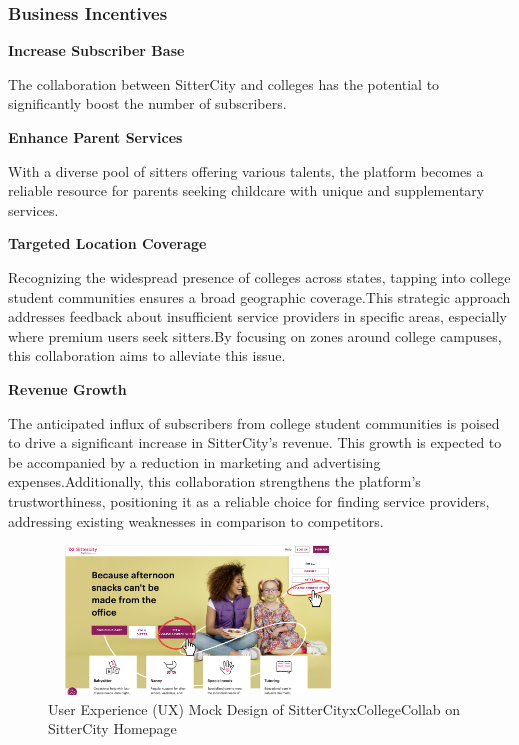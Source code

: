 \documentclass[12pt]{article}
\begin{document}
\hypertarget{business-incentives}{%
\subsubsection{\texorpdfstring{\textbf{Business
Incentives}}{Business Incentives}}\label{business-incentives}}

\textbf{Increase Subscriber Base}

The collaboration between SitterCity and colleges has the potential to
significantly boost the number of subscribers.~

\textbf{Enhance Parent Services}

With a diverse pool of sitters offering various talents, the platform
becomes a reliable resource for parents seeking childcare with unique
and supplementary services.

\textbf{Targeted Location Coverage}

Recognizing the widespread presence of colleges across states, tapping
into college student communities ensures a broad geographic
coverage.This strategic approach addresses feedback about insufficient
service providers in specific areas, especially where premium users seek
sitters.By focusing on zones around college campuses, this collaboration
aims to alleviate this issue.

\textbf{Revenue Growth}

The anticipated influx of subscribers from college student communities
is poised to drive a significant increase in SitterCity's revenue. This
growth is expected to be accompanied by a reduction in marketing and
advertising expenses.Additionally, this collaboration strengthens the
platform's trustworthiness, positioning it as a reliable choice for
finding service providers, addressing existing weaknesses in comparison
to competitors. \newpage

\begin{figure}
  \centering
  \includegraphics[width=300px, height=150px]{IMAGES/UX1.png}
  \caption{User Experience (UX) Mock Design of SitterCityxCollegeCollab on SitterCity Homepage}
\end{figure}
\end{document}
